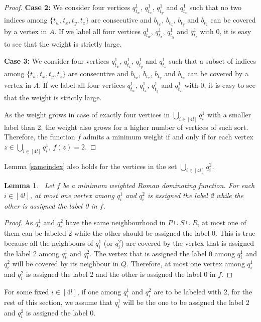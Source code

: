 \documentclass[preprint,12pt]{elsarticle}
\newtheorem{lemma}{Lemma}
\begin{document}
\begin{proof}
    \medskip\noindent
    \textbf{Case 2: }We consider four vertices $q_{t_w}^1$, $q_{t_x}^1$, $q_{t_y}^1$ and $q_{t_z}^1$ such that no two indices among $\{t_w,t_x, t_y, t_z\}$ are consecutive and $b_{t_w}$, $b_{t_x}$, $b_{t_y}$ and $b_{t_z}$ can be covered by a vertex in $A$. If we label all four vertices $q_{t_w}^1$, $q_{t_x}^1$, $q_{t_y}^1$ and $q_{t_z}^1$ with 0, it is easy to see that the weight is strictly large. 

    \medskip\noindent
    \textbf{Case 3: }We consider four vertices $q_{t_w}^1$, $q_{t_x}^1$, $q_{t_y}^1$ and $q_{t_z}^1$ such that a subset of indices among $\{t_w,t_x, t_y, t_z\}$ are consecutive and $b_{t_w}$, $b_{t_x}$, $b_{t_y}$ and $b_{t_z}$ can be covered by a vertex in $A$. If we label all four vertices $q_{t_w}^1$, $q_{t_x}^1$, $q_{t_y}^1$ and $q_{t_z}^1$ with 0, it is easy to see that the weight is strictly large.

    As the weight grows in case of exactly four vertices in $\bigcup\limits_{i \in [4l]} q_i^1$ with a smaller label than 2, the weight also grows for a higher number of vertices of such sort. Therefore, the function $f$ admits a minimum weight if and only if for each vertex $z \in \bigcup\limits_{i \in [4l]} q_i^1$, $f(z) = 2.$
\end{proof}
Lemma \ref{sameindex} also holds for the vertices in the set $\bigcup\limits_{i \in [4l]} q_i^2$. 
\begin{lemma}~\label{onlyone}
    Let $f$ be a minimum weighted Roman dominating function. For each $i \in [4l]$, at most one vertex among $q_i^1$ and $q_i^2$ is assigned the label 2 while the other is assigned the label 0 in $f$.
\end{lemma}
\begin{proof}
    As $q_i^1$ and $q_i^2$ have the same neighbourhood in $P \cup S \cup R$, at most one of them can be labeled 2 while the other should be assigned the label 0. This is true because all the neighbours of $q_i^1$ (or $q_i^2$) are covered by the vertex that is assigned the label 2 among $q_i^1$ and $q_i^2$. The vertex that is assigned the label 0 among $q_i^1$ and $q_i^2$ will be covered by its neighbour in $Q$. Therefore, at most one vertex among $q_i^1$ and $q_i^2$ is assigned the label 2 and the other is assigned the label 0 in $f$.
\end{proof}
For some fixed $i \in [4l]$, if one among $q_i^1$ and $q_i^2$ are to be labeled with 2, for the rest of this section, we assume that $q_i^1$ will be the one to be assigned the label 2 and $q_i^2$ is assigned the label 0.
\end{document}
